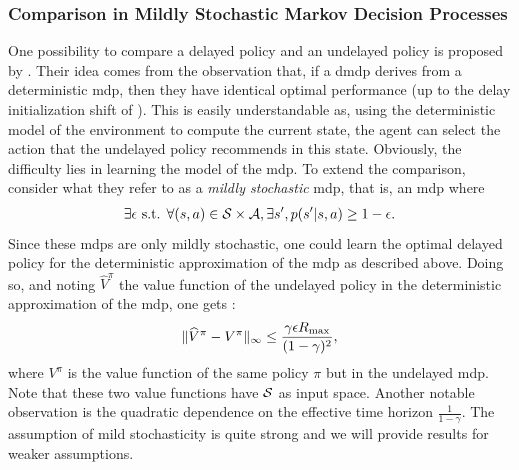 \subsubsection{Comparison in Mildly Stochastic Markov Decision Processes}
One possibility to compare a delayed policy and an undelayed policy is proposed by \cite{walsh2009learning}. 
Their idea comes from the observation that, if a \gls{dmdp} derives from a deterministic \gls{mdp}, then they have identical optimal performance (up to the delay initialization shift of ). 
This is easily understandable as, using the deterministic model of the environment to compute the current state, the agent can select the action that the undelayed policy recommends in this state. Obviously, the difficulty lies in learning the model of the \gls{mdp}.
To extend the comparison, \cite{walsh2009learning} consider what they refer to as a \textit{mildly stochastic} \gls{mdp}, that is, an \gls{mdp} where 
\begin{align*}
    \exists \epsilon \text{ s.t. } \forall (s,a)\in\mathcal{S}\times\mathcal{A}, \exists s', p(s'\vert s,a)\geq 1-\epsilon.
\end{align*}
Since these \glspl{mdp} are only mildly stochastic, one could learn the optimal delayed policy for the deterministic approximation of the \gls{mdp} as described above. 
Doing so, and noting $\widehat{V}^{\pi}$ the value function of the undelayed policy in the deterministic approximation of the \gls{mdp}, one gets \cite[Theorem~3]{walsh2009learning}:
\begin{align*}
    \lVert \widehat{V}^{\pi}-{V}^{\pi}\rVert_{\infty}\leq \frac{\gamma\epsilon {R_{\max}}}{(1-\gamma)^2},
\end{align*}
where ${V}^{\pi}$ is the value function of the same policy $\pi$ but in the undelayed \gls{mdp}.
Note that these two value functions have $\mathcal{S}$ as input space. 
Another notable observation is the quadratic dependence on the effective time horizon $\textstyle\frac{1}{1-\gamma}$.
The assumption of mild stochasticity is quite strong and we will provide results for weaker assumptions.

